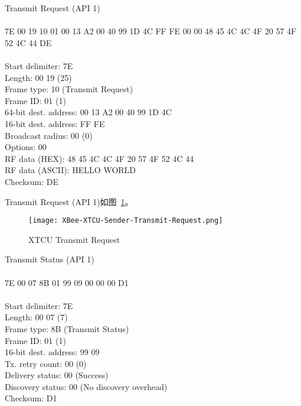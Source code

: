 \begin{tcolorbox}
    Transmit Request (API 1)
    \\ 
    \\ 7E 00 19 10 01 00 13 A2 00 40 99 1D 4C FF FE 00 00 48 45 4C 4C 4F 20 57 4F 52 4C 44 DE
    \\ 
    \\ Start delimiter: 7E
    \\ Length: 00 19 (25)
    \\ Frame type: 10 (Transmit Request)
    \\ Frame ID: 01 (1)
    \\ 64-bit dest. address: 00 13 A2 00 40 99 1D 4C
    \\ 16-bit dest. address: FF FE
    \\ Broadcast radius: 00 (0)
    \\ Options: 00
    \\ RF data (HEX): 48 45 4C 4C 4F 20 57 4F 52 4C 44
    \\ RF data (ASCII): HELLO WORLD
    \\ Checksum: DE
\end{tcolorbox}

Transmit Request (API 1)如图~\ref{fig:XBee-XTCU-Sender-Transmit-Request}。

\begin{figure}[htbp]
    \centering
    \texttt{[image: XBee-XTCU-Sender-Transmit-Request.png]}
    \caption{XTCU Transmit Request}
    \label{fig:XBee-XTCU-Sender-Transmit-Request}
\end{figure}

\begin{tcolorbox}
    Transmit Status (API 1)
    \\ 
    \\ 7E 00 07 8B 01 99 09 00 00 00 D1
    \\ 
    \\ Start delimiter: 7E
    \\ Length: 00 07 (7)
    \\ Frame type: 8B (Transmit Status)
    \\ Frame ID: 01 (1)
    \\ 16-bit dest. address: 99 09
    \\ Tx. retry count: 00 (0)
    \\ Delivery status: 00 (Success)
    \\ Discovery status: 00 (No discovery overhead)
    \\ Checksum: D1
\end{tcolorbox}

